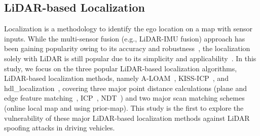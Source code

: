 \subsection{LiDAR-based Localization} \label{sec:lidar_slam}
Localization is a methodology to identify the ego location on a map with sensor inputs. While the multi-sensor fusion (e.g., LiDAR-IMU fusion) approach has been gaining popularity owing to its accuracy and robustness~\cite{fastlio2,koide2024_02}, the localization solely with LiDAR is still popular due to its simplicity and applicability~\cite{vizzo2023ral, cticp, mulls}. In this study, we focus on the three popular LiDAR-based localization algorithms, LiDAR-based localization methods, namely A-LOAM~\cite{zhang2014loam}, KISS-ICP~\cite{vizzo2023ral}, and hdl\_localization~\cite{koide2019portable}, covering three major point distance calculations (plane and edge feature matching~\cite{zhang2014loam}, ICP~\cite{zhang1994iterative}, NDT~\cite{magnusson2009three}) and two major scan matching schemes (online local map and using prior-map).
This study is the first to explore the vulnerability of these major LiDAR-based localization methods against LiDAR spoofing attacks in driving vehicles.


